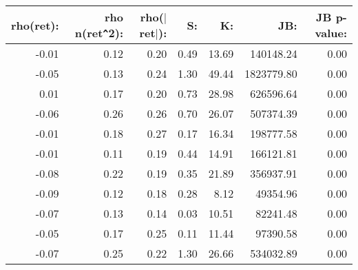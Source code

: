 \begin{tabular}{rrrrrrr}
  \toprule
rho(ret): & rho n(ret\verb|^|2): & rho($|$ret$|$): & S: & K: & JB: & JB p-value: \\ 
  \midrule
-0.01 & 0.12 & 0.20 & 0.49 & 13.69 & 140148.24 & 0.00 \\ 
  -0.05 & 0.13 & 0.24 & 1.30 & 49.44 & 1823779.80 & 0.00 \\ 
  0.01 & 0.17 & 0.20 & 0.73 & 28.98 & 626596.64 & 0.00 \\ 
  -0.06 & 0.26 & 0.26 & 0.70 & 26.07 & 507374.39 & 0.00 \\ 
  -0.01 & 0.18 & 0.27 & 0.17 & 16.34 & 198777.58 & 0.00 \\ 
  -0.01 & 0.11 & 0.19 & 0.44 & 14.91 & 166121.81 & 0.00 \\ 
  -0.08 & 0.22 & 0.19 & 0.35 & 21.89 & 356937.91 & 0.00 \\ 
  -0.09 & 0.12 & 0.18 & 0.28 & 8.12 & 49354.96 & 0.00 \\ 
  -0.07 & 0.13 & 0.14 & 0.03 & 10.51 & 82241.48 & 0.00 \\ 
  -0.05 & 0.17 & 0.25 & 0.11 & 11.44 & 97390.58 & 0.00 \\ 
  -0.07 & 0.25 & 0.22 & 1.30 & 26.66 & 534032.89 & 0.00 \\ 
   \bottomrule
\end{tabular}
